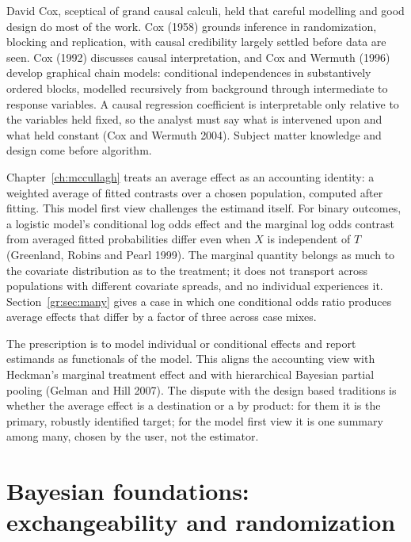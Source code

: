 David Cox, sceptical of grand causal calculi, held that careful modelling and good design do most of the work. Cox (1958) grounds inference in randomization, blocking and replication, with causal credibility largely settled before data are seen. Cox (1992) discusses causal interpretation, and Cox and Wermuth (1996) develop graphical chain models: conditional independences in substantively ordered blocks, modelled recursively from background through intermediate to response variables. A causal regression coefficient is interpretable only relative to the variables held fixed, so the analyst must say what is intervened upon and what held constant (Cox and Wermuth 2004). Subject matter knowledge and design come before algorithm.

Chapter~\ref{ch:mccullagh} treats an average effect as an accounting identity: a weighted average of fitted contrasts over a chosen population, computed after fitting. This model first view challenges the estimand itself. For binary outcomes, a logistic model's conditional log odds effect and the marginal log odds contrast from averaged fitted probabilities differ even when $X$ is independent of $T$ (Greenland, Robins and Pearl 1999). The marginal quantity belongs as much to the covariate distribution as to the treatment; it does not transport across populations with different covariate spreads, and no individual experiences it. Section~\ref{gr:sec:many} gives a case in which one conditional odds ratio produces average effects that differ by a factor of three across case mixes.

The prescription is to model individual or conditional effects and report estimands as functionals of the model. This aligns the accounting view with Heckman's marginal treatment effect and with hierarchical Bayesian partial pooling (Gelman and Hill 2007). The dispute with the design based traditions is whether the average effect is a destination or a by product: for them it is the primary, robustly identified target; for the model first view it is one summary among many, chosen by the user, not the estimator.

\section{Bayesian foundations: exchangeability and randomization}\label{fw:sec:bayes}


